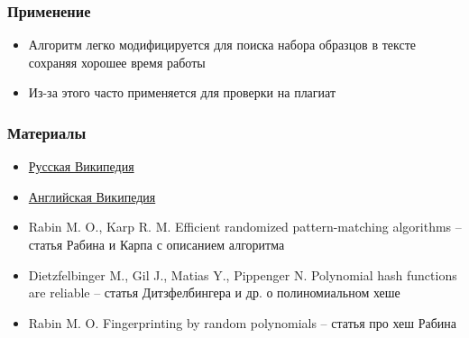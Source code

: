 \documentclass[aspectratio=169]{beamer}
\begin{document}
\begin{frame}
    \frametitle{Применение}
    \begin{itemize}
        \item Алгоритм легко модифицируется для поиска набора образцов в тексте сохраняя
              хорошее время работы
        \item Из-за этого часто применяется для проверки на плагиат
    \end{itemize}
\end{frame}

\begin{frame}[fragile]
    \frametitle{Материалы}
    \begin{itemize}
        \item \href{https://ru.wikipedia.org/wiki/%D0%90%D0%BB%D0%B3%D0%BE%D1%80%D0%B8%D1%82%D0%BC_%D0%A0%D0%B0%D0%B1%D0%B8%D0%BD%D0%B0_%E2%80%94_%D0%9A%D0%B0%D1%80%D0%BF%D0%B0}{Русская Википедия}
        \item \href{https://en.wikipedia.org/wiki/Rabin%E2%80%93Karp_algorithm}{Английская Википедия}
        \item Rabin M. O., Karp R. M. Efficient randomized pattern-matching algorithms -- статья Рабина и Карпа с описанием алгоритма
        \item Dietzfelbinger M., Gil J., Matias Y., Pippenger N. Polynomial hash functions are reliable -- статья Дитзфелбингера и др. о полиномиальном хеше
        \item Rabin M. O. Fingerprinting by random polynomials  -- статья про хеш Рабина
    \end{itemize}
\end{frame}
\end{document}
